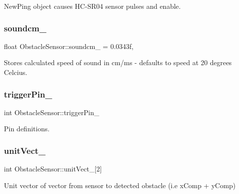 New\+Ping object causes H\+C-\/\+S\+R04 sensor pulses and enable. 

\mbox{\label{class_obstacle_sensor_ae6d0b250f37a34d04103d43e4e4e0082}} 
\subsubsection{\texorpdfstring{soundcm\+\_\+}{soundcm\_}}
{\footnotesize\ttfamily float Obstacle\+Sensor\+::soundcm\+\_\+ = 0.\+0343f\hspace{0.3cm}{\ttfamily [static]}, {\ttfamily [private]}}



Stores calculated speed of sound in cm/ms -\/ defaults to speed at 20 degrees Celcius. 

\mbox{\label{class_obstacle_sensor_a8bda5595b38379dd74e1c4c7204ad0af}} 
\subsubsection{\texorpdfstring{trigger\+Pin\+\_\+}{triggerPin\_}}
{\footnotesize\ttfamily int Obstacle\+Sensor\+::trigger\+Pin\+\_\+\hspace{0.3cm}{\ttfamily [private]}}



Pin definitions. 

\mbox{\label{class_obstacle_sensor_ab03d3a917fc37e816f35949f1185fbc7}} 
\subsubsection{\texorpdfstring{unit\+Vect\+\_\+}{unitVect\_}}
{\footnotesize\ttfamily int Obstacle\+Sensor\+::unit\+Vect\+\_\+\mbox{[}2\mbox{]}}



Unit vector of vector from sensor to detected obstacle (i.\+e x\+Comp + y\+Comp) 

